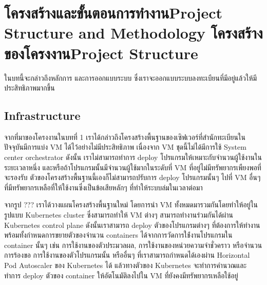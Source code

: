 \chapter{\ifproject%
\ifcpe โครงสร้างและขั้นตอนการทำงาน\else Project Structure and Methodology\fi
\else%
\ifcpe โครงสร้างของโครงงาน\else Project Structure\fi
\fi
}

ในบทนี้จะกล่าวถึงหลักการ และการออกแบบระบบ ซึ่งเราจะออกแบบระบบลงทะเบียนที่มีอยู่แล้วให้มีประสิทธิภาพมากขึ้น

\makeatletter

\section {Infrastructure}

จากที่มาของโครงงานในบทที่ 1 เราได้กล่าวถึงโครงสร้างพื้นฐานของเซิฟเวอร์ที่สำนักทะเบียนในปัจจุบันมีการแบ่ง VM \cite{vm} ได้ไว้อย่างไม่มีประสิทธิภาพ เนื่องจาก VM ชุดนี้ไม่ได้มีการใช้ System center orchestrator \cite{sco} ดังนั้น เราไม่สามารถทำการ deploy โปรแกรมให้เหมาะกับจำนวนผู้ใช้งานในระยะเวลาหนึ่ง และหรือถ้าโปรแกรมนั้นมีจำนวนผู้ใช้มากในระดับที่ VM ที่อยู่ไม่มีทรัพยากรเพืยงพอที่จะรองรับ ตัวของโครงสร้างพื้นฐานนี้เองก็ไม่สามารถปรับการ deploy โปรแกรมนั้นๆ ไปที่ VM อื่นๆ ที่มีทรัพยากรเหลือที่ให้ใช้งานซึ่งเป็นข้อเสียหลักๆ ที่ทำให้ระบบล่มในเวลาต่อมา

จากรูป ??? เราได้วางแผนโครงสร้างพื้นฐานใหม่ โดยการนำ VM ทั้งหมดมารวมกันโดยทำให้อยู่ในรูปแบบ Kubernetes cluster ซึ่งสามารถทำให้ VM ต่างๆ สามารถทำงานร่วมกันได้ผ่าน Kubernetes control plane \cite{kubecomp} ดังนั้นเราสามารถ deploy ตัวของโปรแกรมต่างๆ ที่ต้องการให้ทำงานพร้อมทั้งกำหนดการขยายตัวของจำนวน containers ได้จากการวัดการใช้่งานโปรแกรมใน container นั้นๆ เช่น การใช้งานของตัวประมวลผล, การใช้งานของหน่วยความจำชั่วคราว หรือจำนวนการร้องขอ การใช้งานของตัวโปรแกรมนั้น หรืออื่นๆ ที่เราสามารถกำหนดได้เองผ่าน Horizontal Pod Autoscaler \cite{kubehpa} ของ Kubernetes ได้ แล้วทางตัวของ Kubernetes จะทำการคำนวณและทำการ deploy ตัวของ container ให้อัตโนมัติลงไปใน VM ที่ยังคงมีทรัพยากรเหลือใช้อยู่